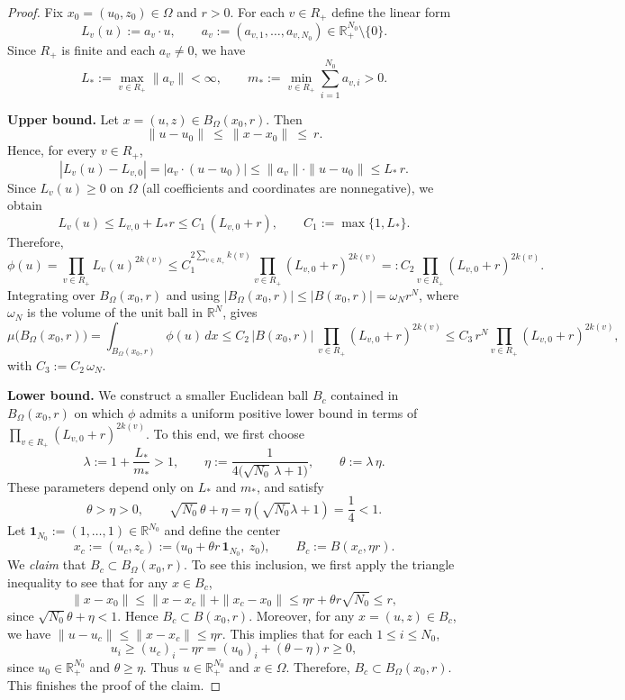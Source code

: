 \documentclass[12pt]{amsart}
\begin{document}
\begin{proof}
Fix $x_0=(u_0,z_0)\in\Omega$ and $r>0$. For each $v\in R_+$ define the linear form
\[
L_v(u):=a_v\cdot u,\qquad a_v:=(a_{v,1},\dots,a_{v,N_{0}})\in \mathbb{R}_+^{N_{0}}\setminus\{0\}.
\]
Since $R_+$ is finite and each $a_v\neq 0$, we have
\[
L_*:=\max_{v\in R_+}\|a_v\|<\infty,
\qquad
m_*:=\min_{v\in R_+}\sum_{i=1}^{N_{0}} a_{v,i}>0.
\]

\noindent
\textbf{Upper bound.}
Let $x=(u,z)\in B_\Omega(x_0,r)$. Then
\[
\|u-u_0\|\ \le\ \|x-x_0\|\ \le\ r.
\]
Hence, for every $v\in R_+$,
\[
|L_v(u)-L_{v,0}|
=\big|a_v\cdot (u-u_0)\big|
\le \|a_v\|\cdot\|u-u_0\|
\le L_*\,r.
\]
Since $L_v(u)\ge 0$ on $\Omega$ (all coefficients and coordinates are nonnegative), we obtain
\[
L_v(u)\le L_{v,0}+L_*r\le C_1\,(L_{v,0}+r),
\qquad
C_1:=\max\{1,L_*\}.
\]
Therefore,
\[
\phi(u)
=\prod_{v\in R_+} L_v(u)^{2k(v)}
\le C_1^{2\sum_{v\in R_+}k(v)}\prod_{v\in R_+}(L_{v,0}+r)^{2k(v)}
=:C_2\prod_{v\in R_+}(L_{v,0}+r)^{2k(v)}.
\]
Integrating over $B_\Omega(x_0,r)$ and using
$|B_\Omega(x_0,r)|\le |B(x_0,r)|=\omega_N r^N$, where $\omega_N$ is the volume of the unit ball in $\mathbb{R}^N$, gives
\[
\mu\big(B_\Omega(x_0,r)\big)
=\int_{B_\Omega(x_0,r)}\phi(u)\,dx
\le C_2\,|B(x_0,r)|\,\prod_{v\in R_+}(L_{v,0}+r)^{2k(v)}
\le C_3\,r^N\prod_{v\in R_+}(L_{v,0}+r)^{2k(v)},
\]
with $C_3:=C_2\,\omega_N$.

\medskip\noindent
\textbf{Lower bound.}
We construct a smaller Euclidean ball $B_c$ contained in $B_\Omega(x_0,r)$ on which $\phi$ admits a uniform
positive lower bound in terms of $\prod_{v\in R_+}(L_{v,0}+r)^{2k(v)}$. To this end, we first choose
\[
\lambda:=1+\frac{L_*}{m_*}>1,
\qquad
\eta:=\frac{1}{4\big(\sqrt{N_{0}}\,\lambda+1\big)},
\qquad
\theta:=\lambda\,\eta.
\]
These parameters depend only on $L_*$ and $m_*$, and satisfy
\[
\theta> \eta>0,
\qquad
\sqrt{N_{0}}\,\theta+\eta=\eta(\sqrt{N_{0}}\lambda+1)=\frac14<1.
\]
Let $\mathbf{1}_{N_{0}}:=(1,\dots,1)\in\mathbb{R}^{N_{0}}$ and define the center
\[
x_c:=(u_c,z_c):=\big(u_0+\theta r\,\mathbf{1}_{N_{0}},\ z_0\big),
\qquad
B_c:=B(x_c,\eta r).
\]
We {\it claim} that $B_c\subset B_\Omega(x_0,r)$. To see this inclusion, we first apply the triangle inequality to see that for any $x\in B_c$,
\[
\|x-x_0\|\le \|x-x_c\|+\|x_c-x_0\|
\le \eta r+\theta r\sqrt{N_{0}}
\le r,
\]
since $\sqrt{N_{0}}\theta+\eta<1$. Hence $B_c\subset B(x_0,r)$. Moreover, for any $x=(u,z)\in B_c$, we have $\|u-u_c\|\le \|x-x_c\|\le \eta r$. This implies that for each $1\le i\le N_{0}$,
\[
u_i\ge (u_c)_i-\eta r=(u_0)_i+(\theta-\eta)r\ge 0,
\]
since $u_0\in\mathbb{R}_+^{N_{0}}$ and $\theta\ge\eta$. Thus $u\in\mathbb{R}_+^{N_{0}}$ and $x\in\Omega$. Therefore,  $B_c\subset B_\Omega(x_0,r)$. This finishes  the proof of the  claim.


\end{proof}
\end{document}
